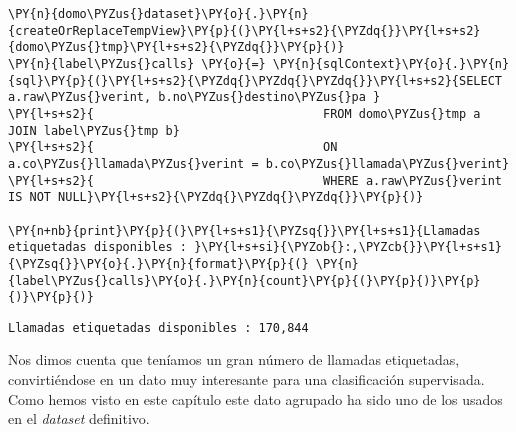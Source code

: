 \vspace{0.5cm}
    \begin{tcolorbox}[breakable, size=fbox, boxrule=1pt, pad at break*=1mm,colback=cellbackground, colframe=cellborder]
\begin{Verbatim}[commandchars=\\\{\}]
\PY{n}{domo\PYZus{}dataset}\PY{o}{.}\PY{n}{createOrReplaceTempView}\PY{p}{(}\PY{l+s+s2}{\PYZdq{}}\PY{l+s+s2}{domo\PYZus{}tmp}\PY{l+s+s2}{\PYZdq{}}\PY{p}{)}
\PY{n}{label\PYZus{}calls} \PY{o}{=} \PY{n}{sqlContext}\PY{o}{.}\PY{n}{sql}\PY{p}{(}\PY{l+s+s2}{\PYZdq{}\PYZdq{}\PYZdq{}}\PY{l+s+s2}{SELECT a.raw\PYZus{}verint, b.no\PYZus{}destino\PYZus{}pa }
\PY{l+s+s2}{                                FROM domo\PYZus{}tmp a JOIN label\PYZus{}tmp b}
\PY{l+s+s2}{                                ON a.co\PYZus{}llamada\PYZus{}verint = b.co\PYZus{}llamada\PYZus{}verint}
\PY{l+s+s2}{                                WHERE a.raw\PYZus{}verint IS NOT NULL}\PY{l+s+s2}{\PYZdq{}\PYZdq{}\PYZdq{}}\PY{p}{)}

\PY{n+nb}{print}\PY{p}{(}\PY{l+s+s1}{\PYZsq{}}\PY{l+s+s1}{Llamadas etiquetadas disponibles : }\PY{l+s+si}{\PYZob{}:,\PYZcb{}}\PY{l+s+s1}{\PYZsq{}}\PY{o}{.}\PY{n}{format}\PY{p}{(} \PY{n}{label\PYZus{}calls}\PY{o}{.}\PY{n}{count}\PY{p}{(}\PY{p}{)}\PY{p}{)}\PY{p}{)}  
\end{Verbatim}
\end{tcolorbox}

    \begin{Verbatim}[commandchars=\\\{\}]
Llamadas etiquetadas disponibles : 170,844
    \end{Verbatim}

 Nos dimos cuenta que teníamos un gran número de llamadas etiquetadas, convirtiéndose en un dato muy interesante para una clasificación supervisada. Como hemos visto en este capítulo este dato agrupado ha sido uno de los usados en el \textit{dataset} definitivo.
 
 
 